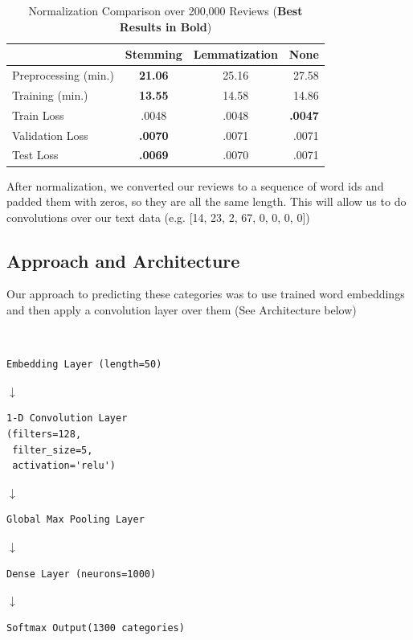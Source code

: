 \documentclass{article}
\begin{document}
\begin{table}[h!]
	\begin{center}
		\caption{Normalization Comparison over 200,000 Reviews (\textbf{Best Results in Bold})}
		\label{tab:table1}
		\begin{tabular}{l||c|c|r} %
			\textbf{} & \textbf{Stemming} & \textbf{Lemmatization} & \textbf{None}\\
			\hline
			Preprocessing (min.) & \textbf{21.06} & 25.16 & 27.58\\
			Training (min.) & \textbf{13.55} & 14.58 & 14.86\\
			Train Loss & .0048 & .0048 & \textbf{.0047}\\
			Validation Loss & \textbf{.0070} & .0071 & .0071\\
			Test Loss & \textbf{.0069} & .0070 & .0071\\
		\end{tabular}
	\end{center}
\end{table}

After normalization, we converted our reviews to a sequence of word ids and padded them with zeros, so they are all the same length. This will allow us to do convolutions over our text data (e.g. [14, 23, 2, 67, 0, 0, 0, 0])

\subsection*{Approach and Architecture}

Our approach to predicting these categories was to use trained word embeddings and then apply a convolution layer over them (See Architecture below)

\mbox{}\\
\begin{verbatim}
Embedding Layer (length=50)
\end{verbatim}
$\downarrow$
\begin{verbatim}
1-D Convolution Layer
(filters=128,
 filter_size=5,
 activation='relu')
\end{verbatim}
$\downarrow$
\begin{verbatim}
Global Max Pooling Layer
\end{verbatim}
$\downarrow$
\begin{verbatim}
Dense Layer (neurons=1000)
\end{verbatim}
$\downarrow$
\begin{verbatim}
Softmax Output(1300 categories)
\end{verbatim}
\mbox{}\\
\end{document}
